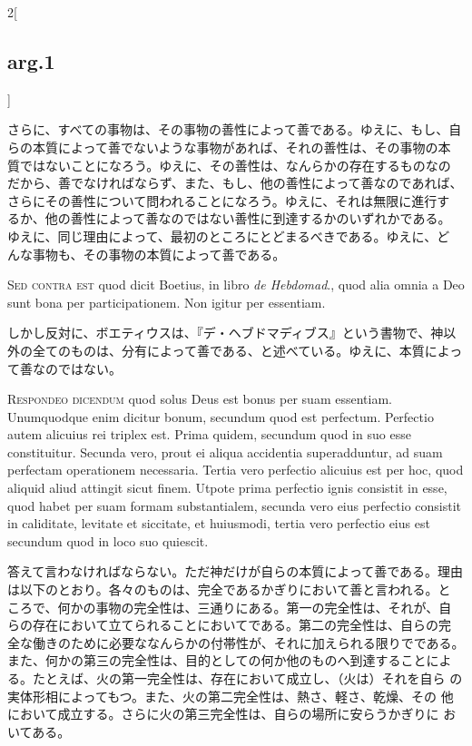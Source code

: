 \documentclass[paper=a4paper,fontsize=10pt,jafontsize=9pt,titlepage]{jlreq}
\begin{document}
\begin{paracol}{2}[\subsection{arg.1}]
\switchcolumn

さらに、すべての事物は、その事物の善性によって善である。ゆえに、もし、自
 らの本質によって善でないような事物があれば、それの善性は、その事物の本
 質ではないことになろう。ゆえに、その善性は、なんらかの存在するものなの
 だから、善でなければならず、また、もし、他の善性によって善なのであれば、
 さらにその善性について問われることになろう。ゆえに、それは無限に進行す
 るか、他の善性によって善なのではない善性に到達するかのいずれかである。
 ゆえに、同じ理由によって、最初のところにとどまるべきである。ゆえに、ど
 んな事物も、その事物の本質によって善である。

\switchcolumn*[\subsection{s.c.}]

{\scshape Sed contra est} quod dicit Boetius, in libro {\itshape de
Hebdomad}., quod alia omnia a Deo sunt bona per participationem. Non
igitur per essentiam.

\switchcolumn

しかし反対に、ボエティウスは、『デ・ヘブドマディブス』という書物で、神以外の全てのものは、分有によって善である、と述べている。ゆえに、本質によって善なのではない。


{\scshape Respondeo dicendum} quod solus Deus est bonus per suam
essentiam. Unumquodque enim dicitur bonum, secundum quod est
perfectum. Perfectio autem alicuius rei triplex est. Prima quidem,
secundum quod in suo esse constituitur. Secunda vero, prout ei aliqua
accidentia superadduntur, ad suam perfectam operationem
necessaria. Tertia vero perfectio alicuius est per hoc, quod aliquid
aliud attingit sicut finem. Utpote prima perfectio ignis consistit in
esse, quod habet per suam formam substantialem, secunda vero eius
perfectio consistit in caliditate, levitate et siccitate, et huiusmodi,
tertia vero perfectio eius est secundum quod in loco suo quiescit.

\switchcolumn

答えて言わなければならない。ただ神だけが自らの本質によって善である。理由
 は以下のとおり。各々のものは、完全であるかぎりにおいて善と言われる。と
 ころで、何かの事物の完全性は、三通りにある。第一の完全性は、それが、自
 らの存在において立てられることにおいてである。第二の完全性は、自らの完
 全な働きのために必要ななんらかの付帯性が、それに加えられる限りでである。
 また、何かの第三の完全性は、目的としての何か他のものへ到達することによ
 る。たとえば、火の第一完全性は、存在において成立し、（火は）それを自ら
 の実体形相によってもつ。また、火の第二完全性は、熱さ、軽さ、乾燥、その
 他において成立する。さらに火の第三完全性は、自らの場所に安らうかぎりに
 おいてある。


\end{paracol}
\end{document}
